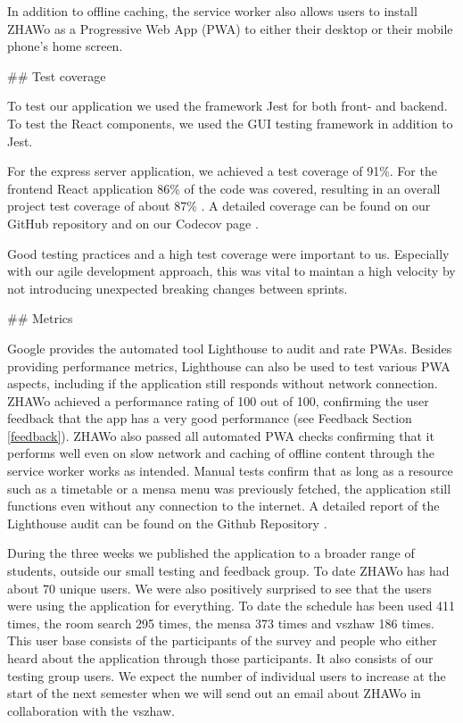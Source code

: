 \begin{markdown}
In addition to offline caching, the service worker also allows users to install ZHAWo as a Progressive Web App (PWA) \cite{WhatIsPWA} to either their desktop or their mobile phone's home screen.

\newpage

## Test coverage

To test our application we used the framework Jest \cite{Jest} for both front- and backend. To test the React components, we used the GUI testing framework \cite{Enzyme} in addition to Jest.

For the express server application, we achieved a test coverage of 91\%. For the frontend React application 86\% of the code was covered, resulting in an overall project test coverage of about 87\% \cite{OurCoverage}. A detailed coverage can be found on our GitHub repository \cite{OurGithub} and on our Codecov page \cite{OurCoverage}.

Good testing practices and a high test coverage were important to us. Especially with our agile development approach, this was vital to maintan a high velocity by not introducing unexpected breaking changes between sprints.

## Metrics

Google provides the automated tool Lighthouse \cite{Lighthouse} to audit and rate PWAs. Besides providing performance metrics, Lighthouse can also be used to test various PWA aspects, including if the application still responds without network connection. ZHAWo achieved a performance rating of 100 out of 100, confirming the user feedback that the app has a very good performance (see Feedback Section \ref{feedback}). ZHAWo also passed all automated PWA checks confirming that it performs well even on slow network and caching of offline content through the service worker works as intended. Manual tests confirm that as long as a resource such as a timetable or a mensa menu was previously fetched, the application still functions even without any connection to the internet. A detailed report of the Lighthouse audit can be found on the Github Repository \cite{OurGithub}.

During the three weeks we published the application to a broader range of students, outside our small testing and feedback group. To date ZHAWo has had about 70 unique users. We were also positively surprised to see that the users were using the application for everything. To date the schedule has been used 411 times, the room search 295 times, the mensa 373 times and vszhaw 186 times. This user base consists of the participants of the survey and people who either heard about the application through those participants. It also consists of our testing group users. We expect the number of individual users to increase at the start of the next semester when we will send out an email about ZHAWo in collaboration with the vszhaw.


\end{markdown}
